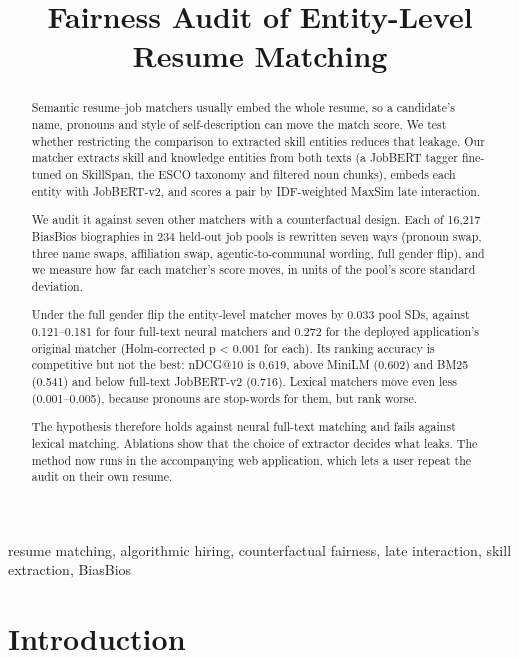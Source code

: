 \documentclass[conference,a4paper]{IEEEtran}
\begin{document}
\title{Fairness Audit of Entity-Level Resume Matching}
\author{
}

\maketitle

\begin{abstract}
Semantic resume–job matchers usually embed the whole resume, so a candidate's name, pronouns and style of self-description can move the match score. We test whether restricting the comparison to extracted skill entities reduces that leakage. Our matcher extracts skill and knowledge entities from both texts (a JobBERT tagger fine-tuned on SkillSpan, the ESCO taxonomy and filtered noun chunks), embeds each entity with JobBERT-v2, and scores a pair by IDF-weighted MaxSim late interaction.

We audit it against seven other matchers with a counterfactual design. Each of 16,217 BiasBios biographies in 234 held-out job pools is rewritten seven ways (pronoun swap, three name swaps, affiliation swap, agentic-to-communal wording, full gender flip), and we measure how far each matcher's score moves, in units of the pool's score standard deviation.

Under the full gender flip the entity-level matcher moves by 0.033 pool SDs, against 0.121–0.181 for four full-text neural matchers and 0.272 for the deployed application's original matcher (Holm-corrected p < 0.001 for each). Its ranking accuracy is competitive but not the best: nDCG@10 is 0.619, above MiniLM (0.602) and BM25 (0.541) and below full-text JobBERT-v2 (0.716). Lexical matchers move even less (0.001–0.005), because pronouns are stop-words for them, but rank worse.

The hypothesis therefore holds against neural full-text matching and fails against lexical matching. Ablations show that the choice of extractor decides what leaks. The method now runs in the accompanying web application, which lets a user repeat the audit on their own resume.

\end{abstract}
\begin{IEEEkeywords}resume matching, algorithmic hiring, counterfactual fairness, late interaction, skill extraction, BiasBios\end{IEEEkeywords}
\section{Introduction}
\end{document}
